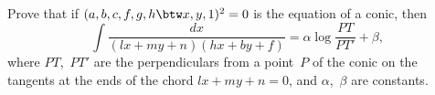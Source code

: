 Prove that if $(a, b, c, f, g, h \btw x, y, 1)^{2} = 0$ is the equation of a conic, then
\[
\int \frac{dx}{(lx + my + n)(hx + by + f)} = \alpha\log \frac{PT}{PT'} + \beta,
\]
where $PT$,~$PT'$ are the perpendiculars from a point~$P$ of the conic on the
tangents at the ends of the chord $lx + my + n = 0$, and $\alpha$,~$\beta$ are constants.

